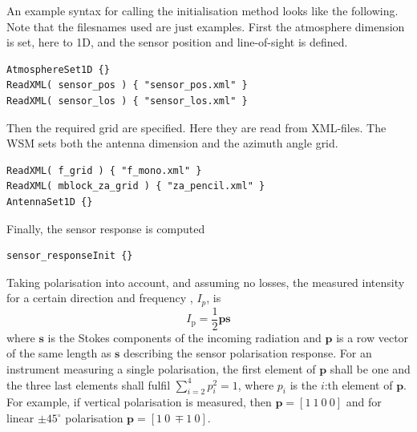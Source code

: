 An example syntax for calling the initialisation method looks like the following. Note that the filesnames used are just examples. First the atmosphere dimension is set, here to 1D, and the sensor position and line-of-sight is defined.
\begin{verbatim}
AtmosphereSet1D {}
ReadXML( sensor_pos ) { "sensor_pos.xml" }
ReadXML( sensor_los ) { "sensor_los.xml" }
\end{verbatim}
Then the required grid are specified. Here they are read from XML-files. The WSM  sets both the antenna dimension and the azimuth angle grid.
\begin{verbatim}
ReadXML( f_grid ) { "f_mono.xml" }
ReadXML( mblock_za_grid ) { "za_pencil.xml" }
AntennaSet1D {} 
\end{verbatim}
Finally, the sensor response is computed
\begin{verbatim}
sensor_responseInit {}
\end{verbatim}

Taking polarisation into account, and assuming no losses, the measured intensity for a certain direction and frequency , $I_p$, is
\begin{equation}
\label{eq:sensor:pol:response}
  I_\mathrm{p} = \frac{1}{2} \mathbf{p} \mathbf{s}
\end{equation}
where $\mathbf{s}$ is the Stokes components of the incoming radiation and $\mathbf{p}$ is a row vector of the same length as $\mathbf{s}$ describing the sensor polarisation response. 
For an instrument measuring a single polarisation, the first element of $\mathbf{p}$ shall be one and the three last elements shall fulfil $\sum_{i=2}^4 p_i^2 = 1$, where
$p_i$ is the $i$:th element of $\mathbf{p}$. For example, if vertical polarisation is measured, then $\mathbf{p}=[1\ 1\ 0\ 0]$ and for linear $\pm45^\circ$ polarisation $\mathbf{p}=[1\ 0\ \mp\!\!1\ 0]$.  

